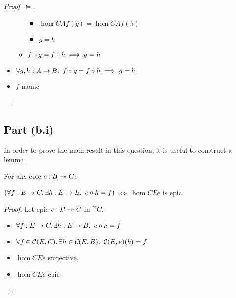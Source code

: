 \begin{prop}
\begin{proof}[Proof $\Leftarrow$]
\begin{itemize}
\begin{itemize}
\begin{itemize}
            \item[\iffs] $\hom{C}{A}{f}(g) = \hom{C}{A}{f}(h)$
              \marginnote{\Def-\ref{def:co-hom}}

            \item[\imps] $g = h$
            \end{itemize}

          \item[\imps] $f\compose g = f\compose h \implies g = h$
            \marginnote{\imps-\Intro-$\dagger$}
        \end{itemize}
      \item[\imps] $\forall g, h : A \to B\ldotp~f\compose g = f\compose h \implies g = h$
        \marginnote{$\forall$-\Intro-$\star$}

      \item[\iffs] $f$ monic
        \qedhere
    \end{itemize}
  \end{proof}
\end{prop}

\subsection{Part (b.i)}\label{sec:q-1-b-i}

In order to prove the main result in this question, it is useful to construct a lemma:

\begin{lemma}\label{lemma:epic-preserve-1}
  For any epic $e : B \epic C$:

  $(\forall f : E\to C\ldotp\exists h : E\to B\ldotp~e\compose h = f)$
  $\iff$ $\hom{C}{E}{e}$ is epic.

  \begin{proof}
    Let epic $e : B \epic C$ in $\cat{C}$.
    \begin{itemize}
      \item[\phs] $\forall f : E\to C\ldotp\exists h : E\to B\ldotp~e\compose h = f$
        \marginnote{\Hyp}
      \item[\iffs]

    $\forall f \in\hom{C}{E}{C}\ldotp\exists h\in\hom{C}{E}{B}\ldotp~\hom{C}{E}{e}(h) = f$
        \marginnote{\Def~\ref{def:hom-set}}

      \item[\iffs]
        $\hom{C}{E}{e}$ surjective.

      \item[\iffs]
        $\hom{C}{E}{e}$ epic
        \qedhere

    \end{itemize}
  \end{proof}
\end{lemma}

